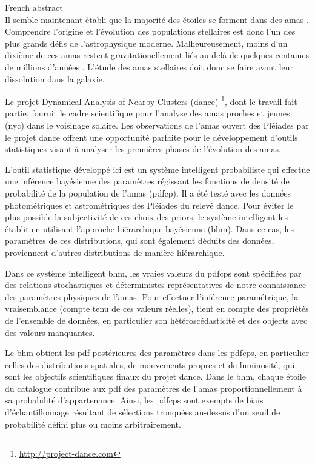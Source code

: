 {\LARGE French abstract}\\


Il semble maintenant établi que la majorité des étoiles se forment dans des amas \citep{2000AJ....120.3139C, 2003AJ....126.1916P,2003ARA&A..41...57L}. Comprendre l'origine et l'évolution des populations stellaires est donc l'un des plus grands défis de l'astrophysique moderne. Malheureusement, moins d'un dixième de ces amas restent gravitationellement liés au delà de quelques centaines de millions d'années \citep{2003ARA&A..41...57L}. L’étude des amas stellaires doit donc se faire avant leur dissolution dans la galaxie.

Le projet Dynamical Analysis of Nearby Clusters (\gls{dance}) \footnote{\url{http://project-dance.com}}, dont le travail fait partie, fournit le cadre scientifique pour l'analyse des amas proches et jeunes (\gls{nyc}) dans le voisinage solaire. Les observations de l'amas ouvert des Pléiades par le projet \gls{dance} offrent une opportunité parfaite pour le développement d'outils statistiques visant à analyser les premières phases de l'évolution des amas.

L'outil statistique développé ici est un système intelligent probabiliste qui effectue une inférence bayésienne des paramètres régissant les fonctions de densité de probabilité  de la population de l'amas (\gls{pdfcp}). Il a été testé avec les données photométriques et astrométriques des Pléiades du relevé \gls{dance}. Pour éviter le plus possible la subjectivité de ces choix des priors, le système intelligent les établit en utilisant l'approche hiérarchique bayésienne (\gls{bhm}). Dans ce cas, les paramètres de ces distributions, qui sont également déduits des données, proviennent d'autres distributions de manière hiérarchique.

Dans ce système intelligent \gls{bhm}, les vraies valeurs du \glspl{pdfcp} sont spécifiées par des relations stochastiques et déterministes représentatives de notre connaissance des paramètres physiques de l'amas. Pour effectuer l'inférence paramétrique, la vraisemblance (compte tenu de ces valeurs réelles), tient en compte des propriétés de l'ensemble de données, en particulier son hétéroscédasticité et des objects avec des valeurs manquantes.

Le \gls{bhm} obtient les \gls{pdf} postérieures des paramètres dans les \glspl{pdfcp}, en particulier celles des distributions spatiales, de mouvements propres et de luminosité, qui sont les objectifs scientifiques finaux du projet \gls{dance}. Dans le \gls{bhm}, chaque étoile du catalogue contribue aux \gls{pdf} des paramètres de l'amas proportionnellement à sa probabilité d'appartenance. Ainsi, les \glspl{pdfcp} sont exempts de biais d'échantillonnage résultant de sélections tronquées au-dessus d'un seuil de probabilité défini plus ou moins arbitrairement.

